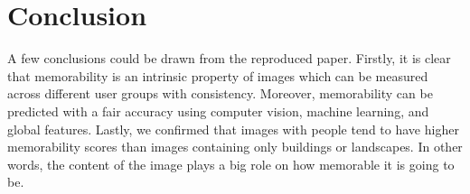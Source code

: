 \documentclass[10pt,twocolumn,letterpaper]{article}
\begin{document}


\section{Conclusion}
A few conclusions could be drawn from the reproduced paper. Firstly, it is clear that memorability is an intrinsic property of images which can be measured across different user groups with consistency. Moreover, memorability can be predicted with a fair accuracy using computer vision, machine learning, and global features. Lastly, we confirmed that images with people tend to have higher memorability scores than images containing only buildings or landscapes. In other words, the content of the image plays a big role on how memorable it is going to be.

{\small


}
\end{document}
